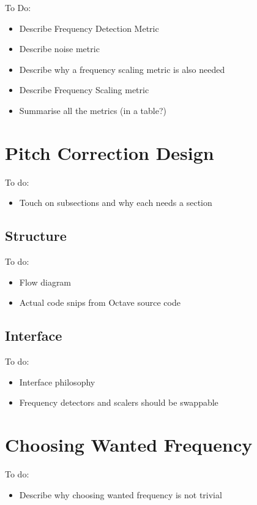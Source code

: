 \color{red}
To Do:
\begin{itemize}
	\item Describe Frequency Detection Metric
	\item Describe noise metric
	\item Describe why a frequency scaling metric is also needed
	\item Describe Frequency Scaling metric
	\item Summarise all the metrics (in a table?)
\end{itemize}
\color{black}

\section{Pitch Correction Design}

\color{red}
To do:
\begin{itemize}
	\item Touch on subsections and why each needs a section
\end{itemize}
\color{black}

\subsection{Structure}

\color{red}
To do:
\begin{itemize}
	\item Flow diagram
	\item Actual code snips from Octave source code
\end{itemize}
\color{black}

\subsection{Interface}

\color{red}
To do:
\begin{itemize}
	\item Interface philosophy
	\item Frequency detectors and scalers should be swappable
\end{itemize}
\color{black}

\section{Choosing Wanted Frequency}

\color{red}
To do:
\begin{itemize}
	\item Describe why choosing wanted frequency is not trivial
\end{itemize}
\color{black}

